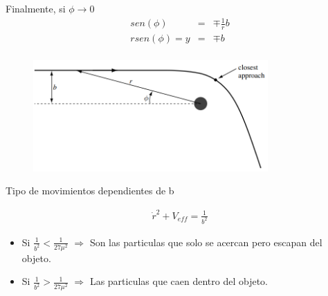 \documentclass[xcolor=dvipsnames]{beamer}
\begin{document}
\begin{frame}{}
    \begin{block}{}
    Finalmente, si $\phi \rightarrow 0$ 
    \begin{eqnarray*}
       sen(\phi)&=&\mp \frac{1}{r}b \\
       rsen(\phi)=y&=&\mp b\\
    \end{eqnarray*}
    \end{block}

\begin{figure}
        \centering
        \includegraphics[width=0.8\textwidth]{Presentations/Images/3_foton_esc_b.png}
    \end{figure}


\end{frame}


\begin{frame}{Tipo de movimientos dependientes de b}
    \begin{block}{}
    \begin{eqnarray*}
        \dot{r}^{2}+V_{eff}=\frac{1}{b^{2}}
    \end{eqnarray*}
    \begin{itemize}
        \item Si $\frac{1}{b^{2}}<\frac{1}{27\mu^{2}}$ $\Rightarrow$ Son las particulas que solo se acercan pero escapan del objeto.\\
       \item Si $\frac{1}{b^{2}}>\frac{1}{27\mu^{2}}$ $\Rightarrow$ Las particulas que caen dentro del objeto.\\

    \end{itemize}
    \end{block}
\end{frame}
\end{document}
